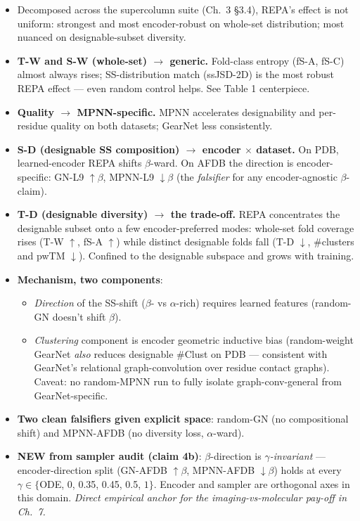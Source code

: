 \documentclass[11pt,a4paper]{article}
\begin{document}
\begin{itemize}[leftmargin=*,itemsep=0pt]
\item Decomposed across the supercolumn suite (Ch.~3 \S3.4), REPA's
effect is not uniform: strongest and most encoder-robust on whole-set
distribution; most nuanced on designable-subset diversity.
\item \textbf{T-W and S-W (whole-set) $\to$ generic.} Fold-class entropy
(fS-A, fS-C) almost always rises; SS-distribution match (ssJSD-2D) is
the most robust REPA effect --- even random control helps. See Table 1
centerpiece.
\item \textbf{Quality $\to$ MPNN-specific.} MPNN accelerates
designability and per-residue quality on both datasets; GearNet less
consistently.
\item \textbf{S-D (designable SS composition) $\to$ encoder $\times$
dataset.} On PDB, learned-encoder REPA shifts $\beta$-ward. On AFDB the
direction is encoder-specific: GN-L9 $\uparrow\beta$, MPNN-L9
$\downarrow\beta$ (the \emph{falsifier} for any encoder-agnostic
$\beta$-claim).
\item \textbf{T-D (designable diversity) $\to$ the trade-off.} REPA
concentrates the designable subset onto a few encoder-preferred modes:
whole-set fold coverage rises (T-W $\uparrow$, fS-A $\uparrow$) while
distinct designable folds fall (T-D $\downarrow$, \#clusters and pwTM
$\downarrow$). Confined to the designable subspace and grows with
training.
\item \textbf{Mechanism, two components}:
  \begin{itemize}[leftmargin=*,itemsep=0pt]
  \item \emph{Direction} of the SS-shift ($\beta$- vs $\alpha$-rich)
  requires learned features (random-GN doesn't shift $\beta$).
  \item \emph{Clustering} component is encoder geometric inductive bias
  (random-weight GearNet \emph{also} reduces designable \#Clust on PDB
  --- consistent with GearNet's relational graph-convolution over residue
  contact graphs). Caveat: no random-MPNN run to fully isolate
  graph-conv-general from GearNet-specific.
  \end{itemize}
\item \textbf{Two clean falsifiers given explicit space}: random-GN
(no compositional shift) and MPNN-AFDB (no diversity loss, $\alpha$-ward).
\item \textbf{NEW from sampler audit (claim 4b)}: $\beta$-direction is
\emph{$\gamma$-invariant} --- encoder-direction split (GN-AFDB
$\uparrow\beta$, MPNN-AFDB $\downarrow\beta$) holds at every
$\gamma\in\{$ODE, 0, 0.35, 0.45, 0.5, $1\}$. Encoder and sampler are
orthogonal axes in this domain. \emph{Direct empirical anchor for the
imaging-vs-molecular pay-off in Ch.~7.}
\end{itemize}
\end{document}

